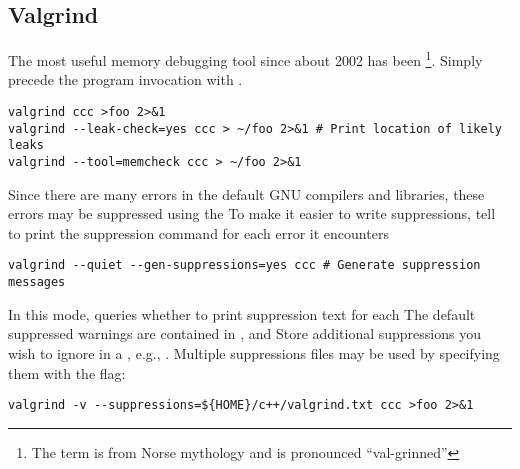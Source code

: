 \documentclass[12pt,twoside]{article}
\begin{document}
\subsection{Valgrind}\label{sxn:valgrind}
The most useful memory debugging tool since about 2002 has been
\footnote{The term is from Norse mythology and is
pronounced ``val-grinned''}. 
Simply precede the program invocation with .
\begin{verbatim}
valgrind ccc >foo 2>&1
valgrind --leak-check=yes ccc > ~/foo 2>&1 # Print location of likely leaks
valgrind --tool=memcheck ccc > ~/foo 2>&1 
\end{verbatim}
Since there are many errors in the default GNU compilers and
libraries, these errors may be suppressed using the 
To make it easier to write suppressions, tell  to
print the suppression command for each error it encounters
\begin{verbatim}
valgrind --quiet --gen-suppressions=yes ccc # Generate suppression messages 
\end{verbatim}
In this mode,  queries whether to print suppression
text for each 
The default suppressed warnings are contained in
, and 
Store additional suppressions you wish to ignore in a 
, e.g., .
Multiple suppressions files may be used by specifying them with the 
 flag: 
\begin{verbatim}
valgrind -v --suppressions=${HOME}/c++/valgrind.txt ccc >foo 2>&1
\end{verbatim}
\end{document}
